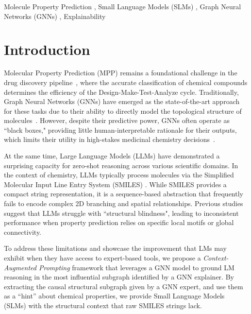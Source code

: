 \documentclass[
]{ceurart}
\begin{document}
\begin{keywords}
Molecule Property Prediction \sep 
Small Language Models (SLMs) \sep
Graph Neural Networks (GNNs) \sep
Explainability
\end{keywords}

\maketitle


\section{Introduction}
\label{sec:intro}

Molecular Property Prediction (MPP) remains a foundational challenge in the drug discovery pipeline~\cite{drug_pipe,drug_pipe1,drug_pipe2}, where the accurate classification of chemical compounds determines the efficiency of the Design-Make-Test-Analyze cycle. Traditionally, Graph Neural Networks (GNNs) have emerged as the state-of-the-art approach for these tasks due to their ability to directly model the topological structure of molecules~\cite{gnn_mols,gnn_mols1,gnn_mols2}. However, despite their predictive power, GNNs often operate as ``black boxes," providing little human-interpretable rationale for their outputs, which limits their utility in high-stakes medicinal chemistry decisions~\cite{xai_survey, xai_survey1}.

\noindent At the same time, Large Language Models (LLMs) have demonstrated a surprising capacity for zero-shot reasoning across various scientific domains. In the context of chemistry, LLMs typically process molecules via the Simplified Molecular Input Line Entry System (SMILES) \cite{smiles1}. While SMILES provides a compact string representation, it is a sequence-based abstraction that frequently fails to encode complex 2D branching and spatial relationships. Previous studies \cite{llm_mols,llm_mols1} suggest that LLMs struggle with ``structural blindness", leading to inconsistent performance when property prediction relies on specific local motifs or global connectivity.

\noindent To address these limitations and showcase the improvement that LMs may exhibit when they have access to expert-based tools, we propose a \textit{Context-Augmented Prompting} framework that leverages a GNN model to ground LM reasoning in the most influential subgraph identified by a GNN explainer. By extracting the causal structural subgraph given by a GNN expert, and use them as a ``hint'' about chemical properties, we provide Small Language Models (SLMs) with the structural context that raw SMILES strings lack. 
\end{document}

